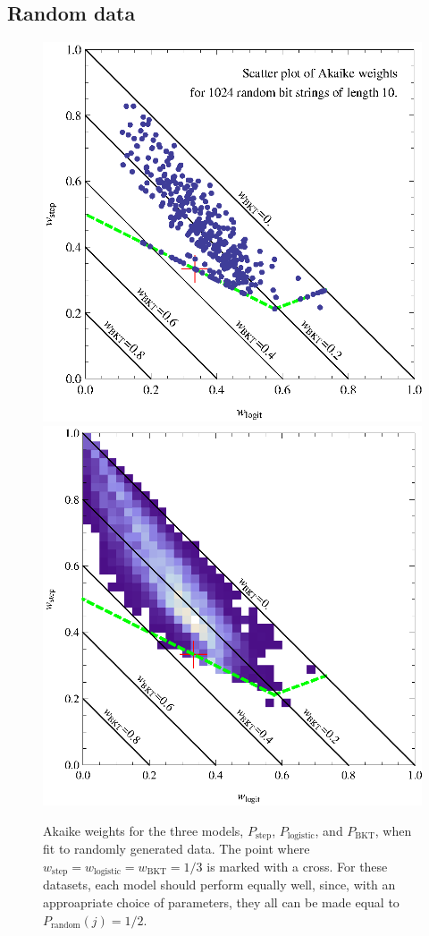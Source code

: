 \documentclass{acmlarge-edm}
\begin{document}
\subsection{Random data}


\begin{figure}
  \includegraphics{scatter10.eps} \hfill
  \includegraphics{density50.eps}
  \caption{Akaike weights for the three models, 
   $P_\mathrm{step}$, $P_\mathrm{logistic}$, and $P_\mathrm{BKT}$, 
   when fit to randomly generated data.  The point where
   $w_\mathrm{step}=w_\mathrm{logistic}=w_\mathrm{BKT}=1/3$ is
   marked with a cross.  For these datasets, each 
   model should perform equally well, since, with an approapriate
   choice of parameters, they all can be made equal to 
    $P_\mathrm{random}(j)=1/2$.}\label{scatter2}
\end{figure}
\end{document}
